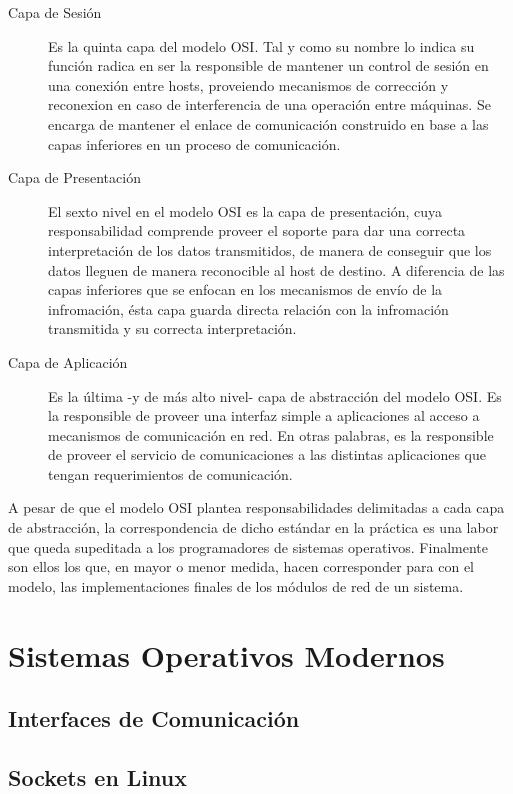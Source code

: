 \begin{description}
\item[Capa de Sesión] Es la quinta capa del modelo OSI. Tal y como su nombre lo indica su función radica en ser la responsible de mantener un control de sesión en una conexión entre hosts, proveiendo mecanismos de corrección y reconexion en caso de interferencia de una operación entre máquinas. Se encarga de mantener el enlace de comunicación construido en base a las capas inferiores en un proceso de comunicación.

\item[Capa de Presentación] El sexto nivel en el modelo OSI es la capa de presentación, cuya responsabilidad comprende proveer el soporte para dar una correcta interpretación de los datos transmitidos, de manera de conseguir que los datos lleguen de manera reconocible al host de destino. A diferencia de las capas inferiores que se enfocan en los mecanismos de envío de la infromación, ésta capa guarda directa relación con la infromación transmitida y su correcta interpretación.

\item[Capa de Aplicación] Es la última -y de más alto nivel- capa de abstracción del modelo OSI. Es la responsible de proveer una interfaz simple a aplicaciones al acceso a mecanismos de comunicación en red. En otras palabras, es la responsible de proveer el servicio de comunicaciones a las distintas aplicaciones que tengan requerimientos de comunicación.

\end{description}

A pesar de que el modelo OSI plantea responsabilidades delimitadas a cada capa de abstracción, la correspondencia de dicho estándar en la práctica es una labor que queda supeditada a los programadores de sistemas operativos. Finalmente son ellos los que, en mayor o menor medida, hacen corresponder para con el modelo, las implementaciones finales de los módulos de red de un sistema.


\section{Sistemas Operativos Modernos}

\subsection{Interfaces de Comunicación}

\subsection{Sockets en Linux}

